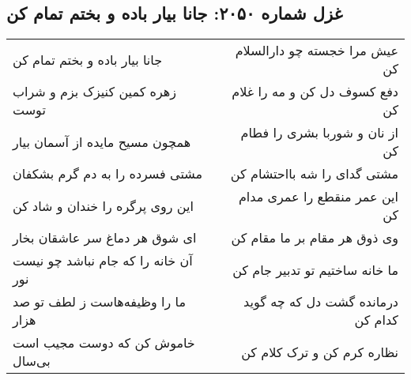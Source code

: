 \begin{center}
\section*{غزل شماره ۲۰۵۰: جانا بیار باده و بختم تمام کن}
\label{sec:2050}
\begin{longtable}{l p{0.5cm} r}
جانا بیار باده و بختم تمام کن
&&
عیش مرا خجسته چو دارالسلام کن
\\
زهره کمین کنیزک بزم و شراب توست
&&
دفع کسوف دل کن و مه را غلام کن
\\
همچون مسیح مایده از آسمان بیار
&&
از نان و شوربا بشری را فطام کن
\\
مشتی فسرده را به دم گرم بشکفان
&&
مشتی گدای را شه بااحتشام کن
\\
این روی پرگره را خندان و شاد کن
&&
این عمر منقطع را عمری مدام کن
\\
ای شوق هر دماغ سر عاشقان بخار
&&
وی ذوق هر مقام بر ما مقام کن
\\
آن خانه را که جام نباشد چو نیست نور
&&
ما خانه ساختیم تو تدبیر جام کن
\\
ما را وظیفه‌هاست ز لطف تو صد هزار
&&
درمانده گشت دل که چه گوید کدام کن
\\
خاموش کن که دوست مجیب است بی‌سال
&&
نظاره کرم کن و ترک کلام کن
\\
\end{longtable}
\end{center}
